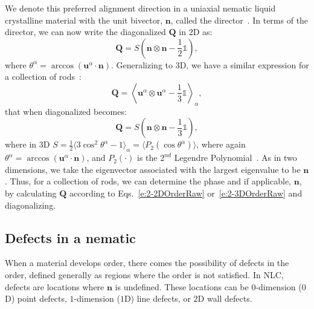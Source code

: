 We denote this preferred alignment direction in a uniaxial nematic liquid crystalline material with the unit bivector, $\mathbf{n}$, called the director~\cite{RN33}.
In terms of the director, we can now write the diagonalized $\mathbf{Q}$ in 2D as:
\begin{equation}
  \mathbf{Q} = S \left ( \mathbf{n} \otimes \mathbf{n} - \frac{1}{2}\mathbb{1} \right ),\label{e:2-2DOrderDiag}
\end{equation}
where $\theta^{\alpha} = \arccos (\mathbf{u}^{\alpha} \cdot \mathbf{n})$.
Generalizing to 3D, we have a similar expression for a collection of rods~\cite{RN33}:
\begin{equation}
  \mathbf{Q} =  \left \langle \mathbf{u}^{\alpha} \otimes \mathbf{u}^{\alpha} - \frac{1}{3} \mathbb{1} \right \rangle_{\alpha},\label{e:2-3DOrderRaw}
\end{equation}
that when diagonalized becomes:
\begin{equation}
  \mathbf{Q} = S \left ( \mathbf{n} \otimes \mathbf{n} - \frac{1}{3}\mathbb{1} \right ),\label{e:2-3DOrderDiag}
\end{equation}
where in 3D $S = \frac{1}{2} \big \langle 3 \cos^2 \theta^{\alpha}  - 1 \big  \rangle_{\alpha} = \big \langle P_2(\cos \theta^{\alpha}) \big \rangle $,
where again $\theta^{\alpha} = \arccos (\mathbf{u}^{\alpha} \cdot \mathbf{n})$, and $P_2(\cdot)$ is the $2^{nd}$ Legendre Polynomial~\cite{RN33}.
As in two dimensions, we take the eigenvector associated with the largest eigenvalue to be $\mathbf{n}$.
Thus, for a collection of rods, we can determine the phase and if applicable, $\mathbf{n}$, by calculating $\mathbf{Q}$ according to Eqs.~\ref{e:2-2DOrderRaw} or~\ref{e:2-3DOrderRaw} and diagonalizing.


\subsection{Defects in a nematic}
When a material develops order, there comes the possibility of defects in the order, defined generally as regions where the order is not satisfied.
In NLC, defects are locations where $\mathbf{n}$ is undefined.
These locations can be $0$-dimension ($0$D) point defects, $1$-dimension ($1$D) line defects, or $2$D wall defects. \\

